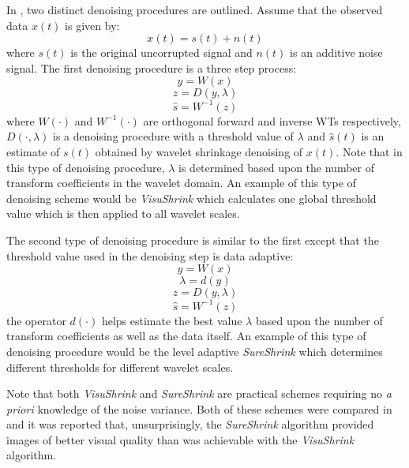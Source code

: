 \documentclass[12pt]{report}
\begin{document}
In \cite{taswellHWW}, two distinct denoising procedures are outlined. Assume that the observed data
$x(t)$ is given by:
\begin{equation}
	x(t) = s(t) + n(t)
\end{equation}
where $s(t)$ is the original uncorrupted signal and $n(t)$ is an additive noise signal.
The first denoising procedure is a three step process:
\begin{equation}
	y = W(x)
\end{equation}
\begin{equation}
	z = D(y,\lambda)
\end{equation}
\begin{equation}
	\hat{s} = W^{-1}(z)
\end{equation}
where $W(\cdot)$ and $W^{-1}(\cdot)$ are orthogonal forward and inverse WTs respectively,
$D(\cdot,\lambda)$ is a denoising procedure with a threshold value of $\lambda$ and $\hat{s}(t)$ is an
estimate of $s(t)$ obtained by wavelet shrinkage denoising of $x(t)$. 
Note that in this type of denoising procedure, $\lambda$ is determined based upon the number of
transform coefficients in the wavelet domain. An example of this type of denoising scheme would
be \emph{VisuShrink} \cite{donohoJohnstone} which calculates one global threshold value which is
then applied to all wavelet scales.

The second type of denoising procedure is similar to the first except that the threshold value
used in the denoising step is data adaptive:
\begin{equation}
	 y = W(x)
\end{equation}
\begin{equation}
\label{lambdaCalc}
	\lambda = d(y)
\end{equation}
\begin{equation}
	z = D(y,\lambda)
\end{equation}
\begin{equation}
	\hat{s} = W^{-1}(z)        
\end{equation}
the operator $d(\cdot)$ helps estimate the best value $\lambda$
based upon the number of transform coefficients as well as the
data itself. An example of this type of denoising procedure would be 
the level adaptive
\emph{SureShrink} \cite{donohoJohnAdapt} which determines different thresholds
for different wavelet scales.

Note that both \emph{VisuShrink} and \emph{SureShrink} are practical
schemes requiring no \emph{a priori} knowledge of the noise variance.
Both of these schemes were compared in \cite{taswellHWW} and it was 
reported that, unsurprisingly, the \emph{SureShrink} algorithm provided images
of better visual quality than was achievable with the \emph{VisuShrink} algorithm.
\end{document}

